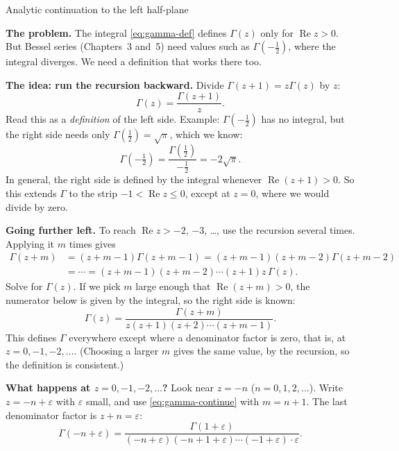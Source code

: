 \documentclass[11pt]{beamer}
\begin{document}
\begin{frame}[allowframebreaks=1.00]{Analytic continuation to the left half-plane}
\footnotesize

\textbf{The problem.} The integral \eqref{eq:gamma-def} defines \(\Gamma(z)\) only for
\(\operatorname{Re}z>0\). But Bessel series (Chapters~3 and~5) need values such as
\(\Gamma(-\tfrac12)\), where the integral diverges. We need a definition that works there too.

\textbf{The idea: run the recursion backward.} Divide \(\Gamma(z+1)=z\Gamma(z)\) by \(z\):
\[
  \Gamma(z)=\frac{\Gamma(z+1)}{z}.
\]
Read this as a \emph{definition} of the left side. Example: \(\Gamma(-\tfrac12)\) has no integral,
but the right side needs only \(\Gamma(\tfrac12)=\sqrt\pi\), which we know:
\[
  \Gamma(-\tfrac12)=\frac{\Gamma(\tfrac12)}{-\tfrac12}=-2\sqrt\pi .
\]
In general, the right side is defined by the integral whenever \(\operatorname{Re}(z+1)>0\). So this
extends \(\Gamma\) to the strip \(-1<\operatorname{Re}z\le0\), except at \(z=0\), where we would divide by
zero.
\par\framebreak\par
\textbf{Going further left.} To reach \(\operatorname{Re}z>-2\), \(-3\), \dots, use the recursion
several times. Applying it \(m\) times gives
\begin{align*}
  \Gamma(z+m)
   &=(z+m-1)\Gamma(z+m-1)
   =(z+m-1)(z+m-2)\Gamma(z+m-2)\\
   &=\cdots
    =(z+m-1)(z+m-2)\cdots(z+1)z\,\Gamma(z).
\end{align*}
Solve for \(\Gamma(z)\). If we pick \(m\) large enough that \(\operatorname{Re}(z+m)>0\), the
numerator below is given by the integral, so the right side is known:
\begin{equation}
  \Gamma(z)
   =\frac{\Gamma(z+m)}
          {z(z+1)(z+2)\cdots(z+m-1)}.
  \label{eq:gamma-continue}
\end{equation}
This defines \(\Gamma\) everywhere except where a denominator factor is zero, that is, at
\(z=0,-1,-2,\dots\). (Choosing a larger \(m\) gives the same value, by the recursion, so the
definition is consistent.)
\par\framebreak\par
\textbf{What happens at \(z=0,-1,-2,\dots\)?} Look near \(z=-n\) (\(n=0,1,2,\dots\)). Write
\(z=-n+\varepsilon\) with \(\varepsilon\) small, and use \eqref{eq:gamma-continue} with \(m=n+1\).
The last denominator factor is \(z+n=\varepsilon\):
\[
  \Gamma(-n+\varepsilon)
   =\frac{\Gamma(1+\varepsilon)}
     {(-n+\varepsilon)(-n+1+\varepsilon)\cdots(-1+\varepsilon)\cdot\varepsilon}.
\]
\end{frame}
\end{document}
